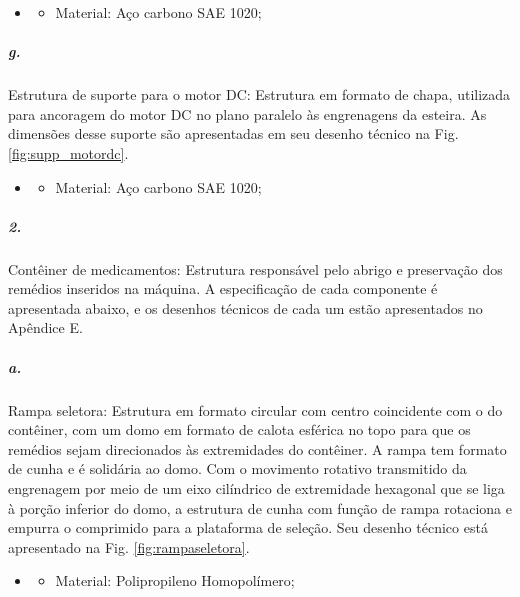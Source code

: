     \begin{itemize}
   \item[]
   \begin{itemize}
       \item Material: Aço carbono SAE 1020;
   \end{itemize}
   \end{itemize}
     
    
    
    \subparagraph*{g.} \label{Retorno_suporte_motorDC}
    Estrutura de suporte para o motor DC: Estrutura em formato de chapa, utilizada para ancoragem do motor DC no plano paralelo às engrenagens da esteira.  As dimensões desse suporte são apresentadas em seu desenho técnico na Fig. \ref{fig:supp_motordc}.
    
    \begin{itemize}
   \item[]
   \begin{itemize}
       \item Material: Aço carbono SAE 1020;
   \end{itemize}
   \end{itemize}
     


\subparagraph*{2.}
Contêiner de medicamentos: Estrutura responsável pelo abrigo e preservação dos remédios inseridos na máquina. A especificação de cada componente é apresentada abaixo, e os desenhos técnicos de cada um estão apresentados no Apêndice E.

    \subparagraph*{a.} \label{retorno_rampaseletora}
    Rampa seletora: Estrutura em formato circular com centro coincidente com o do contêiner, com um domo em formato de calota esférica no topo para que os remédios sejam direcionados às extremidades do contêiner. A rampa tem formato de cunha e é solidária ao domo. Com o movimento rotativo transmitido da engrenagem por meio de um eixo cilíndrico de extremidade hexagonal que se liga à porção inferior do domo, a estrutura de cunha com função de rampa rotaciona e empurra o comprimido para a plataforma de seleção.
    Seu desenho técnico está apresentado na Fig. \ref{fig:rampaseletora}.
    
    \begin{itemize}
   \item[]
   \begin{itemize}
       \item Material: Polipropileno Homopolímero;
   \end{itemize}
   \end{itemize}
     
